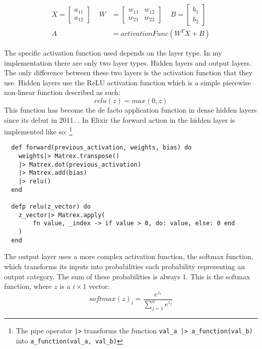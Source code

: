 \begin{equation}
    \begin{aligned}
        X = \begin{bmatrix}
            a_{11} \\
            a_{12}
        \end{bmatrix} \, \, \, \, \, \, \,
        W &= \begin{bmatrix}
            w_{11} & w_{12} \\
            w_{21} & w_{22}
        \end{bmatrix} \, \, \, \, \, \, \,
        B = \begin{bmatrix}
            b_{1} \\
            b_{2}
        \end{bmatrix} \\[10pt]
        A &= activationFunc( W^{T}X + B)
    \end{aligned}
\end{equation}

The specific activation function used depends on the layer type. In my
implementation there are only two layer types. Hidden layers and output layers.
The only difference between these two layers is the activation function that
they use. Hidden layers use the ReLU activation function which is a simple
piecewise non-linear function described as such:
\begin{equation}
    relu(z) = max(0,z)
\end{equation}
This function has become the de facto application function in dense hidden
layers since its debut in 2011. \cite{glorot2011deep}. In Elixir the forward
action in the hidden layer is implemented like so: \footnote{The pipe operator
\lstinline{|>} transforms the function \lstinline{val_a |> a_function(val_b)}
into \lstinline{a_function(val_a, val_b)}}
\begin{lstlisting}
  def forward(previous_activation, weights, bias) do
    weights|> Matrex.transpose()
    |> Matrex.dot(previous_activation)
    |> Matrex.add(bias)
    |> relu()
  end

  defp relu(z_vector) do
    z_vector|> Matrex.apply(
        fn value, _index -> if value > 0, do: value, else: 0 end
    )
  end
\end{lstlisting}

The output layer uses a more complex activation function, the softmax function,
which transforms its inputs into probabilities each probability representing an
output category. The sum of these probabilities is always 1. This is the softmax
function, where \(z\) is a \(i \times 1\) vector:
\begin{equation}
    softmax(z)_{i} = \frac{e^{z_{i}}}{\sum_{j=1}^{n} e^{z_{j}}}
\end{equation}

